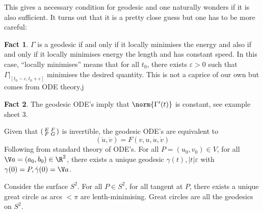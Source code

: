 \documentclass[a4paper]{article}
\theoremstyle{definition}
\newtheorem*{fact}{Fact}
\begin{document}
This gives a necessary condition for geodesic and one naturally wonders if it is also sufficient. It turns out that it is a pretty close guess but one has to be more careful:

\begin{fact}
  \(\Gamma\) is a geodesic if and only if it locally minimises the energy and also if and only if it locally minimises energy the length and has constant speed. In this case, ``locally minimises'' means that for all \(t_0\), there exists \(\varepsilon > 0\) such that \(\Gamma|_{[t_0 - \varepsilon, t_0 + \varepsilon]}\) minimises the desired quantity. This is not a caprice of our own but comes from ODE theory.j
\end{fact}

\begin{fact}
  The geodesic ODE's imply that \(\norm{\Gamma'(t)}\) is constant, see example sheet 3.
\end{fact}

\begin{remark}
  Given that \(\begin{psmallmatrix} E & F \\ F & G \end{psmallmatrix}\) is invertible, the geodesic ODE's are equivalent to
  \[
    (\ddot u, \ddot v) = F(v, u, \dot u, \dot v)
  \]
  Following from standard theory of ODE's. For all \(P = (u_0, v_0) \in V\), for all \(\V a = (a_0, b_0) \in \R^2\), there exists a unique geodesic \(\gamma(t), |t| \varepsilon\) with \(\gamma(0) = P, \dot \gamma(0) = \V a\).
\end{remark}

\begin{eg}
  Consider the surface \(S^2\). For all \(P \in S^2\), for all tangent at \(P\), there exists a unique great circle as arcs \(< \pi\) are lenth-minimising. Great circles are all the geodesics on \(S^2\).
\end{eg}







\printindex

\iffalse
Other courses that might be useful: topology, part of analysis II (differentiability in R^n and inverse function theorem)

Leads to: IID Differential Geometry

Reading List

P.\ Wilson, Curverd Spaces, CUP 2008
From classical geometries to elementary differential geometry
\fi
\end{document}

